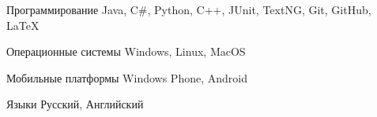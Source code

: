 


\begin{cvskills}


\cvskill
{Программирование} %
{Java, C\#, Python, C++, JUnit, TextNG, Git, GitHub, LaTeX} %



\cvskill
{Операционные системы} %
{Windows, Linux, MacOS} %

\cvskill
{Мобильные платформы} %
{Windows Phone, Android} %


\cvskill
{Языки} %
{Русский, Английский} %


\end{cvskills}